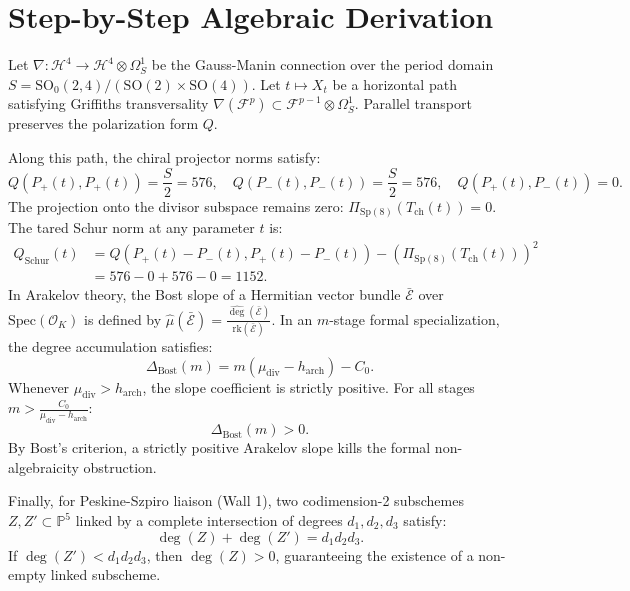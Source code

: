 \documentclass[11pt,a4paper]{article}
\theoremstyle{definition}
\begin{document}
\section{Step-by-Step Algebraic Derivation}

Let $\nabla: \mathcal{H}^4 \to \mathcal{H}^4 \otimes \Omega_S^1$ be the Gauss-Manin connection over the period domain $S = \mathrm{SO}_0(2,4) / (\mathrm{SO}(2) \times \mathrm{SO}(4))$. Let $t \mapsto X_t$ be a horizontal path satisfying Griffiths transversality $\nabla(\mathcal{F}^p) \subset \mathcal{F}^{p-1} \otimes \Omega_S^1$. Parallel transport preserves the polarization form $Q$.

Along this path, the chiral projector norms satisfy:
\begin{equation}
Q(P_+(t), P_+(t)) = \frac{S}{2} = 576, \quad Q(P_-(t), P_-(t)) = \frac{S}{2} = 576, \quad Q(P_+(t), P_-(t)) = 0.
\end{equation}
The projection onto the divisor subspace remains zero: $\Pi_{\mathrm{Sp}(8)}(T_{\mathrm{ch}}(t)) = 0$. The tared Schur norm at any parameter $t$ is:
\begin{align}
Q_{\mathrm{Schur}}(t) &= Q(P_+(t) - P_-(t), P_+(t) - P_-(t)) - (\Pi_{\mathrm{Sp}(8)}(T_{\mathrm{ch}}(t)))^2 \\
&= 576 - 0 + 576 - 0 = 1152.
\end{align}
In Arakelov theory, the Bost slope of a Hermitian vector bundle $\bar{\mathcal{E}}$ over $\mathrm{Spec}(\mathcal{O}_K)$ is defined by $\widehat{\mu}(\bar{\mathcal{E}}) = \frac{\widehat{\deg}(\bar{\mathcal{E}})}{\mathrm{rk}(\bar{\mathcal{E}})}$. In an $m$-stage formal specialization, the degree accumulation satisfies:
\begin{equation}
\Delta_{\mathrm{Bost}}(m) = m (\mu_{\mathrm{div}} - h_{\mathrm{arch}}) - C_0.
\end{equation}
Whenever $\mu_{\mathrm{div}} > h_{\mathrm{arch}}$, the slope coefficient is strictly positive. For all stages $m > \frac{C_0}{\mu_{\mathrm{div}} - h_{\mathrm{arch}}}$:
\begin{equation}
\Delta_{\mathrm{Bost}}(m) > 0.
\end{equation}
By Bost's criterion, a strictly positive Arakelov slope kills the formal non-algebraicity obstruction. 

Finally, for Peskine-Szpiro liaison (Wall 1), two codimension-2 subschemes $Z, Z' \subset \mathbb{P}^5$ linked by a complete intersection of degrees $d_1, d_2, d_3$ satisfy:
\begin{equation}
\deg(Z) + \deg(Z') = d_1 d_2 d_3.
\end{equation}
If $\deg(Z') < d_1 d_2 d_3$, then $\deg(Z) > 0$, guaranteeing the existence of a non-empty linked subscheme.
\end{document}

